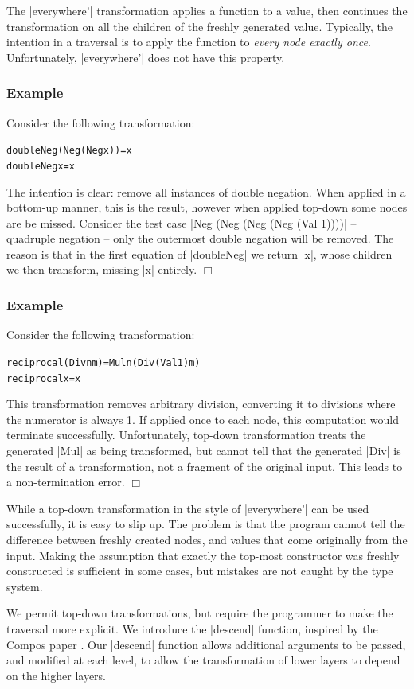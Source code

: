 \documentclass[preprint]{sigplanconf}
\let\cite=\citep
\newcounter{exmp}
\newcommand{\yesexample}{\subsubsection*{Example \arabic{exmp}}\refstepcounter{exmp}}
\newcommand{\noexample}{\hfill$\Box$}
\newenvironment{code}{\begin{alltt}\small}{\end{alltt}}
\newenvironment{example}{\yesexample}{\noexample}
\begin{document}
The |everywhere'| transformation applies a function to a value, then continues the transformation on all the children of the freshly generated value. Typically, the intention in a traversal is to apply the function to \textit{every node exactly once}. Unfortunately, |everywhere'| does not have this property.

\begin{example}
Consider the following transformation:

\begin{code}
doubleNeg (Neg (Neg x))  = x
doubleNeg x              = x
\end{code}

The intention is clear: remove all instances of double negation. When applied in a bottom-up manner, this is the result, however when applied top-down some nodes are be missed. Consider the test case |Neg (Neg (Neg (Neg (Val 1))))| -- quadruple negation -- only the outermost double negation will be removed. The reason is that in the first equation of |doubleNeg| we return |x|, whose children we then transform, missing |x| entirely.
\end{example}

\begin{example}
Consider the following transformation:

\begin{code}
reciprocal (Div n m)  = Mul n (Div (Val 1) m)
reciprocal x          = x
\end{code}

This transformation removes arbitrary division, converting it to divisions where the numerator is always 1. If applied once to each node, this computation would terminate successfully. Unfortunately, top-down transformation treats the generated |Mul| as  being transformed, but cannot tell that the generated |Div| is the result of a transformation, not a fragment of the original input. This leads to a non-termination error.
\end{example}

While a top-down transformation in the style of |everywhere'| can be used successfully, it is easy to slip up. The problem is that the program cannot tell the difference between freshly created nodes, and values that come originally from the input. Making the assumption that exactly the top-most constructor was freshly constructed is sufficient in some cases, but mistakes are not caught by the type system.

We permit top-down transformations, but require the programmer to make the traversal more explicit. We introduce the |descend| function, inspired by the Compos paper \cite{bringert:compos}. Our |descend| function allows additional arguments to be passed, and modified at each level, to allow the transformation of lower layers to depend on the higher layers.
\end{document}
